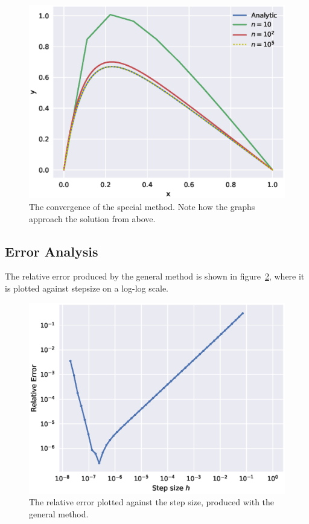 \documentclass[aps,reprint]{revtex4-1}
\begin{document}
\begin{figure}[ht]
  \centering
  \includegraphics[width=\columnwidth]{figures/special.eps}
  \caption{\label{fig:special} The convergence of the special method. Note how
    the graphs approach the solution from above.}
\end{figure}

\subsection{Error Analysis}

The relative error produced by the general method is shown in
figure~\ref{fig:error}, where it is plotted against stepsize on a log-log scale.

\begin{figure}[ht]
  \centering
  \includegraphics[width=\columnwidth]{figures/error.eps}
  \caption{\label{fig:error} The relative error plotted against the step size,
    produced with the general method.}
\end{figure}
\end{document}
